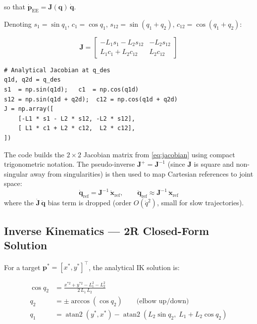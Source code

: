 \documentclass[11pt,a4paper]{article}
\newcommand{\bq}{\bm{q}}
\newcommand{\bdq}{\dot{\bm{q}}}
\newcommand{\bddq}{\ddot{\bm{q}}}
\newcommand{\bJ}{\bm{J}}
\begin{document}
so that $\dot{\bm{p}}_{\mathrm{EE}} = \bJ(\bq)\,\bdq$.

Denoting $s_1 = \sin q_1$, $c_1 = \cos q_1$, $s_{12} = \sin(q_1 + q_2)$, $c_{12} = \cos(q_1 + q_2)$:

\begin{equation}
\bJ = \begin{bmatrix}
    -L_1 s_1 - L_2 s_{12} & -L_2 s_{12} \\
     L_1 c_1 + L_2 c_{12}  &  L_2 c_{12}
\end{bmatrix}
\end{equation}

\begin{lstlisting}[caption={Analytical Jacobian --- \texttt{rl/computed\_torque\_controller.py}}]
# Analytical Jacobian at q_des
q1d, q2d = q_des
s1  = np.sin(q1d);   c1  = np.cos(q1d)
s12 = np.sin(q1d + q2d);  c12 = np.cos(q1d + q2d)
J = np.array([
    [-L1 * s1 - L2 * s12, -L2 * s12],
    [ L1 * c1 + L2 * c12,  L2 * c12],
])
\end{lstlisting}

\begin{codemath}
The code builds the $2\times 2$ Jacobian matrix from \eqref{eq:jacobian} using compact trigonometric notation. The pseudo-inverse $\bJ^{+} = \bJ^{-1}$ (since $\bJ$ is square and non-singular away from singularities) is then used to map Cartesian references to joint space:
\[
    \bdq_{\mathrm{ref}} = \bJ^{-1}\,\dot{\bm{x}}_{\mathrm{ref}}, \qquad
    \bddq_{\mathrm{ref}} \approx \bJ^{-1}\,\ddot{\bm{x}}_{\mathrm{ref}}
\]
where the $\dot{\bJ}\,\bdq$ bias term is dropped (order $O(\dot q^2)$, small for slow trajectories).
\end{codemath}

\subsection{Inverse Kinematics --- 2R Closed-Form Solution}

For a target $\bm{p}^* = [x^*, y^*]^\top$, the analytical IK solution is:

\begin{align}
    \cos q_2 &= \frac{x^{*2} + y^{*2} - L_1^2 - L_2^2}{2\,L_1\,L_2} \label{eq:ik_cosq2}\\
    q_2 &= \pm\arccos(\cos q_2) \qquad \text{(elbow up/down)} \label{eq:ik_q2}\\
    q_1 &= \operatorname{atan2}(y^*, x^*) - \operatorname{atan2}(L_2 \sin q_2,\; L_1 + L_2 \cos q_2) \label{eq:ik_q1}
\end{align}
\end{document}
